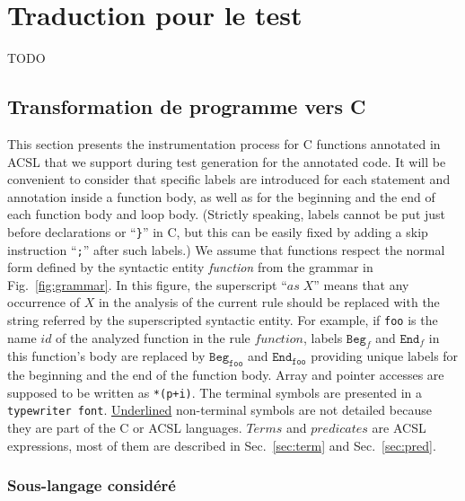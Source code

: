 
\chapter{Traduction pour le test}
\label{sec:traduction}

\chapterintro

TODO

\section{Transformation de programme \acsl vers C}





This section presents the instrumentation process for C functions annotated in
\textsc{ACSL} that we support during test generation for
the annotated code.
It will be convenient to consider that specific labels 
are introduced for each statement and annotation inside a function body, as well
as for  the beginning and the end of each function body and loop body. 
(Strictly speaking, labels cannot be put just before declarations or ``\lstinline|}|'' in C, but this
can be easily fixed by adding a skip instruction ``\lstinline{;}'' after such
labels.)
We assume that functions respect the normal form defined by the syntactic
entity \textit{function} from the grammar in Fig.~\ref{fig:grammar}. 
In this
figure, the superscript ``${\textit{as}\;X}$'' means that any occurrence of $X$
in the analysis of the current rule should be replaced with the string referred
by the superscripted syntactic entity.
For example, if \texttt{foo} is the name $id$ of the analyzed function in the
rule $function$, labels $\texttt{Beg}_f$ and $\texttt{End}_f$ in this function's
body are replaced by $\texttt{Beg}_{\texttt{foo}}$ and $\texttt{End}_{\texttt{foo}}$
providing unique labels for the beginning and the end of the function body.
Array and pointer accesses are supposed to be written as \lstinline|*(p+i)|.
The terminal symbols are presented in a \texttt{typewriter font}.
\underline{Underlined} non-terminal symbols are not detailed because they are
part of the C or ACSL languages.
$Terms$ and $predicates$ are ACSL expressions, most of them are described in
Sec.~\ref{sec:term} and Sec.~\ref{sec:pred}.



\subsection{Sous-langage considéré}

